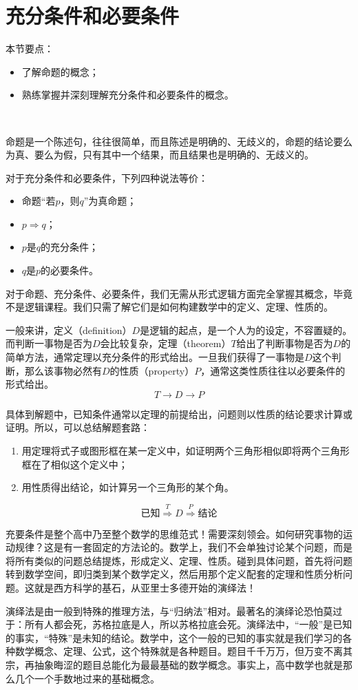 \section{充分条件和必要条件}

本节要点：
\begin{itemize}
    \item 了解命题的概念；
    \item 熟练掌握并深刻理解充分条件和必要条件的概念。
\end{itemize}

~

命题是一个陈述句，往往很简单，而且陈述是明确的、无歧义的，命题的结论要么为真、要么为假，只有其中一个结果，而且结果也是明确的、无歧义的。

对于充分条件和必要条件，下列四种说法等价：
\begin{itemize}
    \item 命题“若$p$，则$q$”为真命题；
    \item $p\Rightarrow q$；
    \item $p$是$q$的充分条件；
    \item $q$是$p$的必要条件。
\end{itemize}

\begin{tcolorbox}
对于命题、充分条件、必要条件，我们无需从形式逻辑方面完全掌握其概念，毕竟不是逻辑课程。我们只需了解它们是如何构建数学中的定义、定理、性质的。
\end{tcolorbox}

一般来讲，定义（definition）$D$是逻辑的起点，是一个人为的设定，不容置疑的。而判断一事物是否为$D$会比较复杂，定理（theorem）$T$给出了判断事物是否为$D$的简单方法，通常定理以充分条件的形式给出。一旦我们获得了一事物是$D$这个判断，那么该事物必然有$D$的性质（property）$P$，通常这类性质往往以必要条件的形式给出。
\[
T\rightarrow D\rightarrow P
\]

具体到解题中，已知条件通常以定理的前提给出，问题则以性质的结论要求计算或证明。所以，可以总结解题套路：
\begin{enumerate}
    \item 用定理将式子或图形框在某一定义中，如证明两个三角形相似即将两个三角形框在了相似这个定义中；
    \item 用性质得出结论，如计算另一个三角形的某个角。
\end{enumerate}
\[
\text{已知}\overset{T}{\Rightarrow}D\overset{P}{\Rightarrow}\text{结论}
\]

\begin{tcolorbox}
充要条件是整个高中乃至整个数学的思维范式！需要深刻领会。如何研究事物的运动规律？这是有一套固定的方法论的。数学上，我们不会单独讨论某个问题，而是将所有类似的问题总结提炼，形成定义、定理、性质。碰到具体问题，首先将问题转到数学空间，即归类到某个数学定义，然后用那个定义配套的定理和性质分析问题。这就是西方科学的基石，从亚里士多德开始的演绎法！
\end{tcolorbox}

\begin{tcolorbox}
演绎法是由一般到特殊的推理方法，与“归纳法”相对。最著名的演绎论恐怕莫过于：所有人都会死，苏格拉底是人，所以苏格拉底会死。演绎法中，“一般”是已知的事实，“特殊”是未知的结论。数学中，这个一般的已知的事实就是我们学习的各种数学概念、定理、公式，这个特殊就是各种题目。题目千千万万，但万变不离其宗，再抽象晦涩的题目总能化为最最基础的数学概念。事实上，高中数学也就是那么几个一个手数地过来的基础概念。
\end{tcolorbox}




